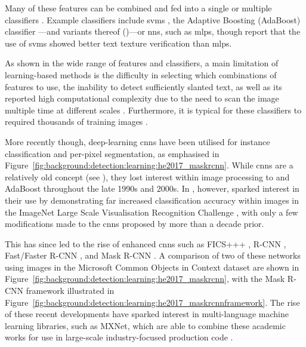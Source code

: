 Many of these features can be combined and fed into a single or multiple classifiers \citep{Pan:2010cj, Hanif:2008un, Hanif:2009tm, Gllavata:2004vq, Ye:2005wu, Wang:2009il, Tu:2003tg}. Example classifiers include \glspl{svm} \citep{Cortes:1995wa,Burges:1998wd,Vapnik:1999vu}, the Adaptive Boosting (AdaBoost) classifier \citep{Freund:1996uc}---and variants thereof (\citep{Friedman:2000jg,Hanif:2009tm,Sochman:2005dn})---or \glspl{nn}, such as \glspl{mlp}, though \citet{Chen:2004tja} report that the use of \glspl{svm} showed better text texture verification than \glspl{mlp}. 

As shown in the wide range of features and classifiers, a main limitation of learning-based methods is the difficulty in selecting which combinations of features to use, the inability to detect sufficiently slanted text, as well as its reported high computational complexity due to the need to scan the image multiple time at different scales \citep{Li:2012wd, Epshtein:2010tj}. Furthermore, it is typical for these classifiers to required thousands of training images \cite{Chen:2004ux}.

More recently though, deep-learning \glspl{cnn} have been utilised for instance classification and per-pixel segmentation, as emphasised in Figure~\ref{fig:background:detection:learning:he2017_maskrcnn}. While \glspl{cnn} are a relatively old concept (see \citet{Lecun:1998hy}), they lost interest within image processing to  and AdaBoost throughout the late 1990s and 2000s. In \citeyear{Krizhevsky:2012wl}, however, \citet{Krizhevsky:2012wl} sparked interest in their use by demonstrating far increased classification accuracy within images in the ImageNet Large Scale Visualisation Recognition Challenge \citep{JiaDeng:2009dl}, with only a few modifications made to the \glspl{cnn} proposed by \citeauthor{Lecun:1998hy} more than a decade prior. 

This has since led to the rise of enhanced \glspl{cnn} such as FICS+++ \citep{Li:2016uj}, R-CNN \citep{Girshick:2014jx}, Fast/Faster R-CNN \citep{Girshick:2015vr, Ren:2017ug}, and Mask R-CNN \citep{He:2017ud}. A comparison of two of these networks using images in the Microsoft Common Objects in Context \cite{Lin:2014vm} dataset are shown in Figure~\ref{fig:background:detection:learning:he2017_maskrcnn}, with the Mask R-CNN framework illustrated in Figure~\ref{fig:background:detection:learning:he2017_maskrcnnframework}. The rise of these recent developments have sparked interest in multi-language machine learning libraries, such as MXNet, which are able to combine these academic works for use in large-scale industry-focused production code \cite{Chen:2015vh}.

